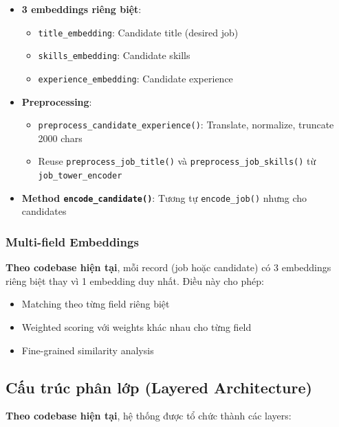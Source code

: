 \begin{itemize}
    \item \textbf{3 embeddings riêng biệt}:
    \begin{itemize}
        \item \texttt{title\_embedding}: Candidate title (desired job)
        \item \texttt{skills\_embedding}: Candidate skills
        \item \texttt{experience\_embedding}: Candidate experience
    \end{itemize}
    
    \item \textbf{Preprocessing}:
    \begin{itemize}
        \item \texttt{preprocess\_candidate\_experience()}: Translate, normalize, truncate 2000 chars
        \item Reuse \texttt{preprocess\_job\_title()} và \texttt{preprocess\_job\_skills()} từ \texttt{job\_tower\_encoder}
    \end{itemize}
    
    \item \textbf{Method \texttt{encode\_candidate()}}: Tương tự \texttt{encode\_job()} nhưng cho candidates
\end{itemize}

\subsubsection{Multi-field Embeddings}

\textbf{Theo codebase hiện tại}, mỗi record (job hoặc candidate) có 3 embeddings riêng biệt thay vì 1 embedding duy nhất. Điều này cho phép:

\begin{itemize}
    \item Matching theo từng field riêng biệt
    \item Weighted scoring với weights khác nhau cho từng field
    \item Fine-grained similarity analysis
\end{itemize}

\subsection{Cấu trúc phân lớp (Layered Architecture)}

\textbf{Theo codebase hiện tại}, hệ thống được tổ chức thành các layers:

